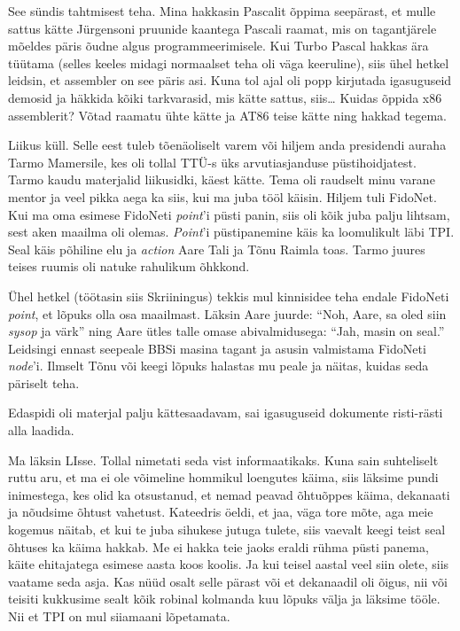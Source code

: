 
See sündis tahtmisest teha. Mina hakkasin  
Pascalit õppima seepärast, et 
mulle sattus kätte Jürgensoni pruunide kaantega Pascali  
raamat, mis on tagantjärele mõeldes 
päris õudne algus programmeerimisele. Kui 
Turbo Pascal hakkas ära tüütama (selles 
keeles midagi normaalset teha oli väga keeruline), siis ühel hetkel 
leidsin, et assembler on see päris asi. Kuna tol 
ajal oli popp kirjutada igasuguseid demosid ja häkkida kõiki tarkvarasid, mis 
kätte sattus, siis\ldots{ }Kuidas õppida x86 
assemblerit? Võtad raamatu ühte kätte ja AT86 teise kätte ning hakkad tegema.


Liikus küll. Selle eest tuleb tõenäoliselt varem või hiljem anda
presidendi auraha Tarmo Mamersile, kes oli tollal 
TTÜ-s üks arvutiasjanduse püstihoidjatest. 
Tarmo kaudu materjalid liikusidki, käest kätte. Tema oli raudselt minu varane 
mentor ja veel pikka aega ka siis, kui ma 
juba tööl käisin. Hiljem tuli 
FidoNet. Kui ma oma esimese FidoNeti \emph{point}'i 
püsti panin, siis oli kõik juba palju lihtsam, sest aken maailma oli
olemas. \emph{Point}'i püstipanemine käis ka loomulikult läbi TPI. Seal käis 
põhiline elu ja \emph{action}   
Aare Tali\label{sisu!aare_tali} ja Tõnu 
Raimla toas. Tarmo juures teises ruumis oli natuke 
rahulikum 
õhkkond. 

Ühel  
hetkel (töötasin siis Skriiningus) tekkis mul kinnisidee teha 
endale FidoNeti \emph{point}, et 
lõpuks olla osa maailmast. Läksin Aare juurde: \enquote{Noh, Aare, 
sa oled siin \emph{sysop} ja värk} ning Aare ütles talle omase abivalmidusega: 
\enquote{Jah, masin on seal.} Leidsingi ennast seepeale BBSi masina tagant ja 
asusin
valmistama FidoNeti \emph{node}'i. Ilmselt Tõnu või keegi 
lõpuks halastas mu peale ja näitas, kuidas seda päriselt teha. 

Edaspidi oli materjal palju kättesaadavam, sai 
igasuguseid dokumente risti-rästi alla laadida. 


Ma läksin LIsse. Tollal nimetati seda vist informaatikaks. 
Kuna sain suhteliselt ruttu aru, et ma ei ole võimeline hommikul loengutes 
käima, siis läksime pundi inimestega, kes olid ka otsustanud, et nemad 
peavad õhtuõppes käima, dekanaati ja nõudsime õhtust vahetust. Kateedris öeldi, 
et jaa, väga tore mõte, aga 
meie kogemus näitab, et kui te juba sihukese jutuga tulete, siis vaevalt keegi 
teist seal õhtuses ka käima hakkab. Me ei hakka teie jaoks  
eraldi rühma püsti panema, käite ehitajatega esimese aasta koos koolis. Ja kui 
teisel aastal veel siin olete, siis vaatame seda asja. Kas nüüd osalt selle 
pärast või et dekanaadil oli õigus, nii või teisiti kukkusime 
sealt kõik robinal kolmanda kuu lõpuks välja ja läksime tööle. Nii 
et TPI on mul siiamaani lõpetamata. 

